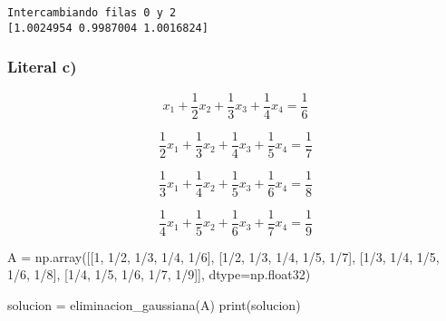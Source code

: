 \documentclass[
  letterpaper,
  DIV=11,
  numbers=noendperiod]{scrartcl}
\newenvironment{Shaded}{\begin{snugshade}}{\end{snugshade}}
\newcommand{\BuiltInTok}[1]{\textcolor[rgb]{0.00,0.23,0.31}{#1}}
\newcommand{\DecValTok}[1]{\textcolor[rgb]{0.68,0.00,0.00}{#1}}
\newcommand{\NormalTok}[1]{\textcolor[rgb]{0.00,0.23,0.31}{#1}}
\newcommand{\OperatorTok}[1]{\textcolor[rgb]{0.37,0.37,0.37}{#1}}
\begin{document}
\begin{verbatim}
Intercambiando filas 0 y 2
[1.0024954 0.9987004 1.0016824]
\end{verbatim}

\subsubsection{Literal c)}\label{literal-c-2}

\[x_1 + \frac{1}{2}x_2 + \frac{1}{3}x_3 + \frac{1}{4}x_4 = \frac{1}{6}\]

\[\frac{1}{2}x_1 + \frac{1}{3}x_2 + \frac{1}{4}x_3 + \frac{1}{5}x_4 = \frac{1}{7}\]

\[\frac{1}{3}x_1 + \frac{1}{4}x_2 + \frac{1}{5}x_3 + \frac{1}{6}x_4 = \frac{1}{8}\]

\[\frac{1}{4}x_1 + \frac{1}{5}x_2 + \frac{1}{6}x_3 + \frac{1}{7}x_4 = \frac{1}{9}\]

\begin{Shaded}
\begin{Highlighting}[]

\NormalTok{A }\OperatorTok{=}\NormalTok{ np.array([[}\DecValTok{1}\NormalTok{, }\DecValTok{1}\OperatorTok{/}\DecValTok{2}\NormalTok{, }\DecValTok{1}\OperatorTok{/}\DecValTok{3}\NormalTok{, }\DecValTok{1}\OperatorTok{/}\DecValTok{4}\NormalTok{, }\DecValTok{1}\OperatorTok{/}\DecValTok{6}\NormalTok{],}
\NormalTok{              [}\DecValTok{1}\OperatorTok{/}\DecValTok{2}\NormalTok{, }\DecValTok{1}\OperatorTok{/}\DecValTok{3}\NormalTok{, }\DecValTok{1}\OperatorTok{/}\DecValTok{4}\NormalTok{, }\DecValTok{1}\OperatorTok{/}\DecValTok{5}\NormalTok{, }\DecValTok{1}\OperatorTok{/}\DecValTok{7}\NormalTok{],}
\NormalTok{              [}\DecValTok{1}\OperatorTok{/}\DecValTok{3}\NormalTok{, }\DecValTok{1}\OperatorTok{/}\DecValTok{4}\NormalTok{, }\DecValTok{1}\OperatorTok{/}\DecValTok{5}\NormalTok{, }\DecValTok{1}\OperatorTok{/}\DecValTok{6}\NormalTok{, }\DecValTok{1}\OperatorTok{/}\DecValTok{8}\NormalTok{],}
\NormalTok{              [}\DecValTok{1}\OperatorTok{/}\DecValTok{4}\NormalTok{, }\DecValTok{1}\OperatorTok{/}\DecValTok{5}\NormalTok{, }\DecValTok{1}\OperatorTok{/}\DecValTok{6}\NormalTok{, }\DecValTok{1}\OperatorTok{/}\DecValTok{7}\NormalTok{, }\DecValTok{1}\OperatorTok{/}\DecValTok{9}\NormalTok{]], dtype}\OperatorTok{=}\NormalTok{np.float32)}

\NormalTok{solucion }\OperatorTok{=}\NormalTok{ eliminacion\_gaussiana(A)}
\BuiltInTok{print}\NormalTok{(solucion)}
\end{Highlighting}
\end{Shaded}
\end{document}
